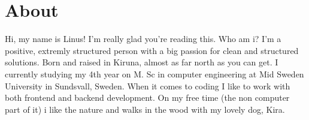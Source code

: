 \section{About}
Hi, my name is Linus! I'm really glad you're reading this.
Who am i? I'm a positive, extremly structured person with a big passion for clean and structured solutions. Born and raised in Kiruna, almost as far north as you can get. I currently studying my 4th year on M. Sc in computer engineering at Mid Sweden University in Sundsvall, Sweden. When it comes to coding I like to work with both frontend and backend development. On my free time (the non computer part of it) i like the nature and walks in the wood with my lovely dog, Kira.